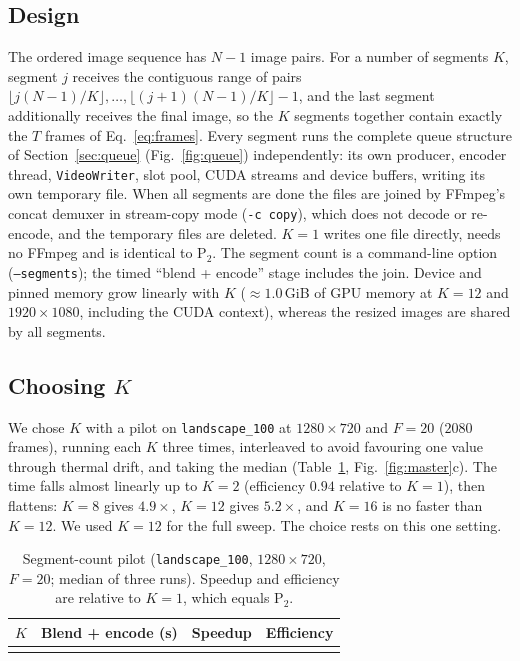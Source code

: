 \documentclass[conference]{IEEEtran}
\begin{document}
\subsection{Design}
The ordered image sequence has $N{-}1$ image pairs. For a number of segments $K$, segment $j$ receives the contiguous range of pairs $\lfloor j(N{-}1)/K\rfloor,\dots,\lfloor (j{+}1)(N{-}1)/K\rfloor-1$, and the last segment additionally receives the final image, so the $K$ segments together contain exactly the $T$ frames of Eq.~\eqref{eq:frames}. Every segment runs the complete queue structure of Section~\ref{sec:queue} (Fig.~\ref{fig:queue}) independently: its own producer, encoder thread, \texttt{VideoWriter}, slot pool, CUDA streams and device buffers, writing its own temporary file. When all segments are done the files are joined by FFmpeg's concat demuxer in stream-copy mode \cite{ffmpeg_concat} (\texttt{-c copy}), which does not decode or re-encode, and the temporary files are deleted. $K{=}1$ writes one file directly, needs no FFmpeg and is identical to P$_2$. The segment count is a command-line option (\texttt{--segments}); the timed ``blend + encode'' stage includes the join. Device and pinned memory grow linearly with $K$ ($\approx 1.0$\,GiB of GPU memory at $K{=}12$ and $1920\times1080$, including the CUDA context), whereas the resized images are shared by all segments.

\subsection{Choosing $K$}
We chose $K$ with a pilot on \texttt{landscape\_100} at $1280\times720$ and $F{=}20$ ($2080$ frames), running each $K$ three times, interleaved to avoid favouring one value through thermal drift, and taking the median (Table~\ref{tab:pilot}, Fig.~\ref{fig:master}c). The time falls almost linearly up to $K{=}2$ (efficiency $0.94$ relative to $K{=}1$), then flattens: $K{=}8$ gives $4.9\times$, $K{=}12$ gives $5.2\times$, and $K{=}16$ is no faster than $K{=}12$. We used $K{=}12$ for the full sweep. The choice rests on this one setting.

\begin{table}[t]
\caption{Segment-count pilot (\texttt{landscape\_100}, $1280\times720$, $F{=}20$; median of three runs). Speedup and efficiency are relative to $K{=}1$, which equals P$_2$.}
\label{tab:pilot}
\centering
\footnotesize
\setlength{\tabcolsep}{5pt}
\begin{tabular}{@{}rrrr@{}}
\toprule
$K$ & Blend + encode (s) & Speedup & Efficiency \\
\midrule
\\
\bottomrule
\end{tabular}
\end{table}
\end{document}
